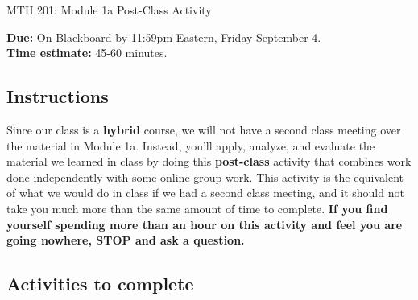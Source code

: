 \documentclass[11pt]{article}
\begin{document}
\begin{flushleft}
        \Large{MTH 201: Module 1a Post-Class Activity}
\end{flushleft}

\begin{flushleft}
    \textbf{Due:} On Blackboard by 11:59pm Eastern, Friday September 4. \\
    \textbf{Time estimate:} 45-60 minutes. 
\end{flushleft}

\subsection*{Instructions}

Since our class is a \textbf{hybrid} course, we will not have a second class meeting over the material in Module 1a. Instead, you'll apply, analyze, and evaluate the material we learned in class by doing this \textbf{post-class} activity that combines work done independently with some online group work. This activity is the equivalent of what we would do in class if we had a second class meeting, and it should not take you much more than the same amount of time to complete. \textbf{If you find yourself spending more than an hour on this activity and feel you are going nowhere, STOP and ask a question.} 





\subsection*{Activities to complete}
\end{document}
